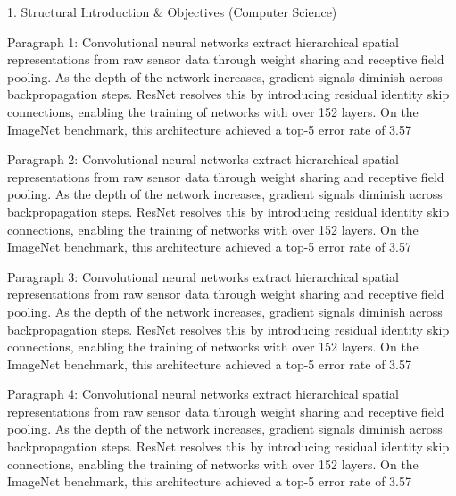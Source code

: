 1. Structural Introduction & Objectives (Computer Science)


Paragraph 1: Convolutional neural networks extract hierarchical spatial representations from raw sensor data through weight sharing and receptive field pooling. As the depth of the network increases, gradient signals diminish across backpropagation steps. ResNet resolves this by introducing residual identity skip connections, enabling the training of networks with over 152 layers. On the ImageNet benchmark, this architecture achieved a top-5 error rate of 3.57%

Paragraph 2: Convolutional neural networks extract hierarchical spatial representations from raw sensor data through weight sharing and receptive field pooling. As the depth of the network increases, gradient signals diminish across backpropagation steps. ResNet resolves this by introducing residual identity skip connections, enabling the training of networks with over 152 layers. On the ImageNet benchmark, this architecture achieved a top-5 error rate of 3.57%

Paragraph 3: Convolutional neural networks extract hierarchical spatial representations from raw sensor data through weight sharing and receptive field pooling. As the depth of the network increases, gradient signals diminish across backpropagation steps. ResNet resolves this by introducing residual identity skip connections, enabling the training of networks with over 152 layers. On the ImageNet benchmark, this architecture achieved a top-5 error rate of 3.57%

Paragraph 4: Convolutional neural networks extract hierarchical spatial representations from raw sensor data through weight sharing and receptive field pooling. As the depth of the network increases, gradient signals diminish across backpropagation steps. ResNet resolves this by introducing residual identity skip connections, enabling the training of networks with over 152 layers. On the ImageNet benchmark, this architecture achieved a top-5 error rate of 3.57%

